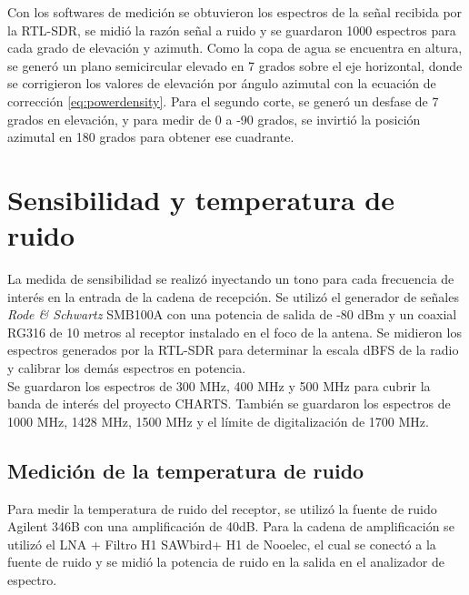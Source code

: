 Con los softwares de medición se obtuvieron los espectros de la señal recibida por la RTL-SDR, se midió la razón señal a ruido y se guardaron 1000 espectros para cada grado de elevación y azimuth. Como la copa de agua se encuentra en altura, se generó un plano semicircular elevado en 7 grados sobre el eje horizontal, donde se corrigieron los valores de elevación por ángulo azimutal con la ecuación de corrección \ref{eq:powerdensity}. Para el segundo corte, se generó un desfase de 7 grados en elevación, y para medir de 0 a -90 grados, se invirtió la posición azimutal en 180 grados para obtener ese cuadrante.\\


\section{Sensibilidad y temperatura de ruido}

La medida de sensibilidad se realizó inyectando un tono para cada frecuencia de interés en la entrada de la cadena de recepción. Se utilizó el generador de señales \textit{Rode \& Schwartz} SMB100A con una potencia de salida de -80 dBm y un coaxial RG316 de 10 metros al receptor instalado en el foco de la antena. Se midieron los espectros generados por la RTL-SDR para determinar la escala dBFS de la radio y calibrar los demás espectros en potencia.\\

Se guardaron los espectros de 300 MHz, 400 MHz y 500 MHz para cubrir la banda de interés del proyecto CHARTS. También se guardaron los espectros de 1000 MHz, 1428 MHz, 1500 MHz y el límite de digitalización de 1700 MHz.\\

\subsection{Medición de la temperatura de ruido}

Para medir la temperatura de ruido del receptor, se utilizó la fuente de ruido Agilent 346B con una amplificación de 40dB. Para la cadena de amplificación se utilizó el LNA + Filtro H1 SAWbird+ H1 de Nooelec, el cual se conectó a la fuente de ruido y se midió la potencia de ruido en la salida en el analizador de espectro.\\

